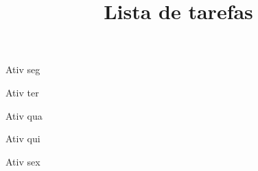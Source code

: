 \title{Lista de tarefas}





\begin{checklist}
  \item{Ativ seg}
  \item{Ativ ter}
  \item{Ativ qua}
  \item{Ativ qui}
  \item{Ativ sex}
\end{checklist}


